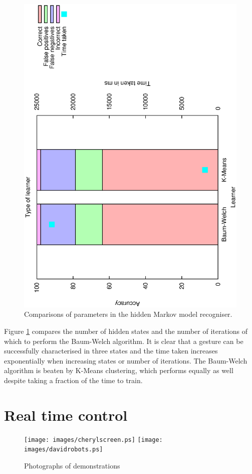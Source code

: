\documentclass[12pt,a4,notitlepage]{report}
\renewcommand{\_}{\texttt{\symbol{95}}}
\newcommand{\<}{\texttt{\symbol{60}}}
\renewcommand{\>}{\texttt{\symbol{62}}}
\begin{document}
\begin{figure}
\includegraphics[scale=0.4,angle=-90]{results/markov/m_learner.ps}
\caption{Comparisons of parameters in the hidden Markov model recogniser.}
\label{m_parameters}
\end{figure}

Figure \ref{m_parameters} compares the number of hidden states and the number of iterations of which to perform the Baum-Welch algorithm. It is clear that a gesture can be successfully characterised in three states and the time taken increases exponentially when increasing states or number of iterations. The Baum-Welch algorithm is beaten by K-Means clustering, which performs equally as well despite taking a fraction of the time to train.

\section{Real time control}
\begin{figure}
\centering
\texttt{[image: images/cherylscreen.ps]}
\texttt{[image: images/davidrobots.ps]}
\caption{Photographs of demonstrations}
\label{demonstrations}
\end{figure}
\end{document}
